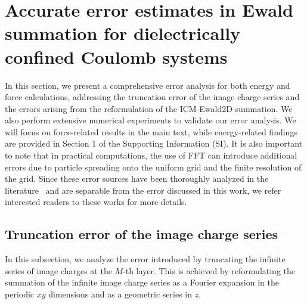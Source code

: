 \section{Accurate error estimates in Ewald summation for dielectrically confined Coulomb systems}

In this section, we present a comprehensive error analysis for both energy and force calculations, addressing the truncation error of the image charge series and the errors arising from the reformulation of the ICM-Ewald2D summation. 
We also perform extensive numerical experiments to validate our error analysis.
We will focus on force-related results in the main text, while energy-related findings are provided in Section 1 of the Supporting Information (SI).
It is also important to note that in practical computations, the use of FFT can introduce additional errors due to particle spreading onto the uniform grid and the finite resolution of the grid. 
Since these error sources have been thoroughly analyzed in the literature~\cite{deserno1998mesh,wang2012numerical,liang2023error,wang2016multiple,barnett2019parallel,barnett2021aliasing} and are separable from the error discussed in this work, we refer interested readers to these works for more details.

\subsection{Truncation error of the image charge series}\label{sec:error_image}

In this subsection, we analyze the error introduced by truncating the infinite series of image charges at the $M$-th layer. 
This is achieved by reformulating the summation of the infinite image charge series as a Fourier expansion in the periodic $xy$ dimensions and as a geometric series in $z$. 

